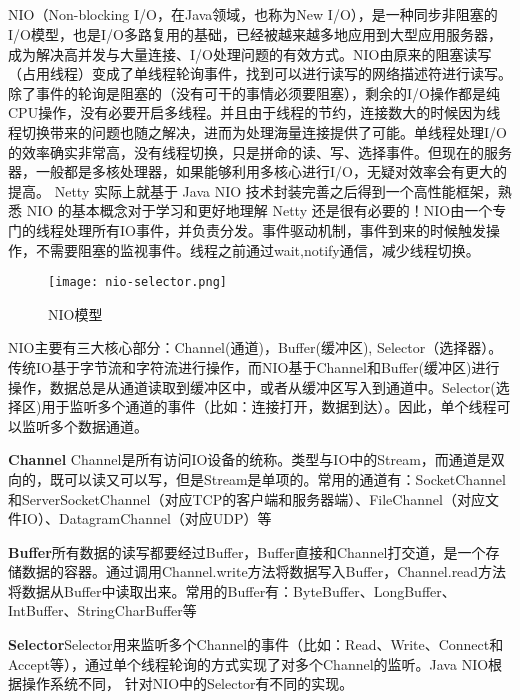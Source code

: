 \documentclass[../../../interview-questions.tex]{subfiles}
\begin{document}
\subsection{\color{red}{Java NIO原理}}

NIO（Non-blocking I/O，在Java领域，也称为New I/O），是一种同步非阻塞的I/O模型，也是I/O多路复用的基础，已经被越来越多地应用到大型应用服务器，成为解决高并发与大量连接、I/O处理问题的有效方式。NIO由原来的阻塞读写（占用线程）变成了单线程轮询事件，找到可以进行读写的网络描述符进行读写。除了事件的轮询是阻塞的（没有可干的事情必须要阻塞），剩余的I/O操作都是纯CPU操作，没有必要开启多线程。并且由于线程的节约，连接数大的时候因为线程切换带来的问题也随之解决，进而为处理海量连接提供了可能。单线程处理I/O的效率确实非常高，没有线程切换，只是拼命的读、写、选择事件。但现在的服务器，一般都是多核处理器，如果能够利用多核心进行I/O，无疑对效率会有更大的提高。
Netty 实际上就基于 Java NIO 技术封装完善之后得到一个高性能框架，熟悉 NIO 的基本概念对于学习和更好地理解 Netty 还是很有必要的！NIO由一个专门的线程处理所有IO事件，并负责分发。事件驱动机制，事件到来的时候触发操作，不需要阻塞的监视事件。线程之前通过wait,notify通信，减少线程切换。

\begin{figure}[htbp]
	\centering
	\texttt{[image: nio-selector.png]}
	\caption{NIO模型}
	\label{fig:nioselector}
\end{figure}


NIO主要有三大核心部分：Channel(通道)，Buffer(缓冲区), Selector（选择器）。传统IO基于字节流和字符流进行操作，而NIO基于Channel和Buffer(缓冲区)进行操作，数据总是从通道读取到缓冲区中，或者从缓冲区写入到通道中。Selector(选择区)用于监听多个通道的事件（比如：连接打开，数据到达）。因此，单个线程可以监听多个数据通道。

\textbf{Channel} Channel是所有访问IO设备的统称。类型与IO中的Stream，而通道是双向的，既可以读又可以写，但是Stream是单项的。常用的通道有：SocketChannel和ServerSocketChannel（对应TCP的客户端和服务器端）、FileChannel（对应文件IO）、DatagramChannel（对应UDP）等

\textbf{Buffer}所有数据的读写都要经过Buffer，Buffer直接和Channel打交道，是一个存储数据的容器。通过调用Channel.write方法将数据写入Buffer，Channel.read方法将数据从Buffer中读取出来。常用的Buffer有：ByteBuffer、LongBuffer、IntBuffer、StringCharBuffer等

\textbf{Selector}Selector用来监听多个Channel的事件（比如：Read、Write、Connect和Accept等），通过单个线程轮询的方式实现了对多个Channel的监听。Java NIO根据操作系统不同， 针对NIO中的Selector有不同的实现。
\end{document}
